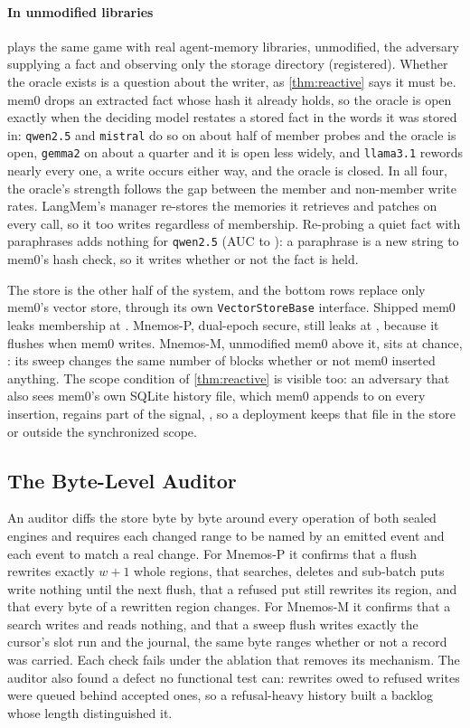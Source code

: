 \paragraph{In unmodified libraries}
 plays the same game with real agent-memory libraries, unmodified, the adversary
supplying a fact and observing only the storage directory (registered). Whether the oracle exists is
a question about the writer, as \cref{thm:reactive} says it must be. mem0 drops an extracted fact
whose hash it already holds, so the oracle is open exactly when the deciding model restates a stored
fact in the words it was stored in: \texttt{qwen2.5} and \texttt{mistral} do so on about half of
member probes and the oracle is open, \texttt{gemma2} on about a quarter and it is open less widely,
and \texttt{llama3.1} rewords nearly every one, a write occurs either way, and the oracle is closed.
In all four, the oracle's strength follows the gap between the member and non-member write rates. LangMem's manager re-stores the memories it retrieves and patches on every call, so it
too writes regardless of membership. Re-probing a quiet fact with paraphrases adds nothing for
\texttt{qwen2.5} (AUC \REthirtyoneQwenKOne{} to \REthirtyoneQwenKThree): a paraphrase is a new
string to mem0's hash check, so it writes whether or not the fact is held.

The store is the other half of the system, and the bottom rows replace only mem0's vector store,
through its own \texttt{VectorStoreBase} interface. Shipped mem0 leaks membership at
\REtwentynineQdrant. Mnemos-P, dual-epoch secure, still leaks at \REtwentyninePStore, because it
flushes when mem0 writes. Mnemos-M, unmodified mem0 above it, sits at chance, \REtwentynineMStore:
its sweep changes the same number of blocks whether or not mem0 inserted anything. The scope
condition of \cref{thm:reactive} is visible too: an adversary that also sees mem0's own SQLite
history file, which mem0 appends to on every insertion, regains part of the signal,
\REtwentynineMAll, so a deployment keeps that file in the store or outside the synchronized scope.

\subsection{The Byte-Level Auditor}
\label{sec:eval-audit}

An auditor diffs the store byte by byte around every operation of both sealed engines and requires
each changed range to be named by an emitted event and each event to match a real change. For
Mnemos-P it confirms that a flush rewrites exactly $w+1$ whole regions, that searches, deletes and
sub-batch puts write nothing until the next flush, that a refused put still rewrites its region, and
that every byte of a rewritten region changes. For Mnemos-M it confirms that a search writes and
reads nothing, and that a sweep flush writes exactly the cursor's slot run and the journal, the
same byte ranges whether or not a record was carried. Each check fails under the ablation that removes
its mechanism. The auditor also found a defect no functional test can: rewrites owed to refused
writes were queued behind accepted ones, so a refusal-heavy history built a backlog whose length
distinguished it.

